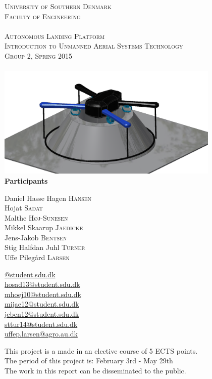 \begin{titlepage}
\begin{center}
	
	\textsc{\LARGE{University of Southern Denmark\\Faculty of Engineering}}\\[1.5cm]
	\HRule \\[0.4cm]
	\textsc{\huge{Autonomous Landing Platform}}\\
	\textsc{\Large{Introduction to Unmanned Aerial Systems Technology\\Group 2, Spring 2015}}\\[0.4cm]
	\HRule \\[1.5cm]
	\includegraphics[width=0.8\textwidth]{imgs/frontpage}~\\[1.5cm]
	\textbf{Participants}\\
	\begin{minipage}[t]{0.48\textwidth}
		\begin{flushright}
			Daniel Hasse Hagen \textsc{Hansen}\\
			Hojat \textsc{Sadat}\\
			Malthe \textsc{Høj-Sunesen}\\
			Mikkel Skaarup \textsc{Jaedicke}\\
			Jens-Jakob \textsc{Bentsen}\\
			Stig Halfdan Juhl \textsc{Turner}\\
			Uffe Pilegård \textsc{Larsen}
		\end{flushright}
	\end{minipage}
	\hfill
	\begin{minipage}[t]{0.48\textwidth}
		\begin{flushleft}
			\url{@student.sdu.dk}\\
			\url{hosad13@student.sdu.dk}\\
			\url{mhoej10@student.sdu.dk}\\
			\url{mijae12@student.sdu.dk}\\
			\url{jeben12@student.sdu.dk}\\
			\url{sttur14@student.sdu.dk}\\
			\url{uffep.larsen@agro.au.dk}\\
		\end{flushleft} 
	\end{minipage}
	\vfill
	\large{This project is a made in an elective course of 5 ECTS points. \\
		The period of this project is: February 3rd - May 29th\\
		The work in this report can be disseminated to the public.}
\end{center}
\end{titlepage}